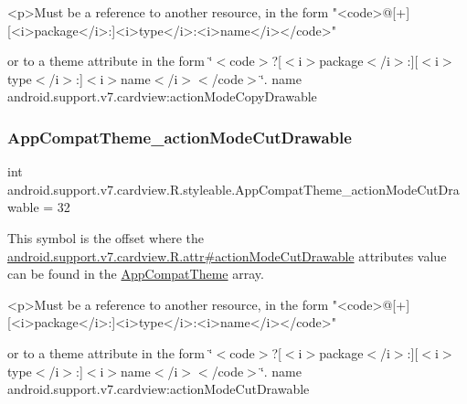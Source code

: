\begin{DoxyVerb}      <p>Must be a reference to another resource, in the form "<code>@[+][<i>package</i>:]<i>type</i>:<i>name</i></code>"
\end{DoxyVerb}
 or to a theme attribute in the form \char`\"{}$<$code$>$?\mbox{[}$<$i$>$package$<$/i$>$\+:\mbox{]}\mbox{[}$<$i$>$type$<$/i$>$\+:\mbox{]}$<$i$>$name$<$/i$>$$<$/code$>$\char`\"{}.  name android.\+support.\+v7.\+cardview\+:action\+Mode\+Copy\+Drawable \mbox{\label{classandroid_1_1support_1_1v7_1_1cardview_1_1R_1_1styleable_a92e60896480e5eb8639971dc11df7943}} 
\subsubsection{\texorpdfstring{App\+Compat\+Theme\+\_\+action\+Mode\+Cut\+Drawable}{AppCompatTheme\_actionModeCutDrawable}}
{\footnotesize\ttfamily int android.\+support.\+v7.\+cardview.\+R.\+styleable.\+App\+Compat\+Theme\+\_\+action\+Mode\+Cut\+Drawable = 32\hspace{0.3cm}{\ttfamily [static]}}

This symbol is the offset where the \hyperlink{classandroid_1_1support_1_1v7_1_1cardview_1_1R_1_1attr_a2fd9053aef5eba94d653e8a130f74f67}{android.\+support.\+v7.\+cardview.\+R.\+attr\#action\+Mode\+Cut\+Drawable} attribute\textquotesingle{}s value can be found in the \hyperlink{classandroid_1_1support_1_1v7_1_1cardview_1_1R_1_1styleable_a52e6f69f954ecc2622d72c0b4d298938}{App\+Compat\+Theme} array.

\begin{DoxyVerb}      <p>Must be a reference to another resource, in the form "<code>@[+][<i>package</i>:]<i>type</i>:<i>name</i></code>"
\end{DoxyVerb}
 or to a theme attribute in the form \char`\"{}$<$code$>$?\mbox{[}$<$i$>$package$<$/i$>$\+:\mbox{]}\mbox{[}$<$i$>$type$<$/i$>$\+:\mbox{]}$<$i$>$name$<$/i$>$$<$/code$>$\char`\"{}.  name android.\+support.\+v7.\+cardview\+:action\+Mode\+Cut\+Drawable \mbox{\label{classandroid_1_1support_1_1v7_1_1cardview_1_1R_1_1styleable_ae43827121aad1319f95c73c42ae1af0d}} 
